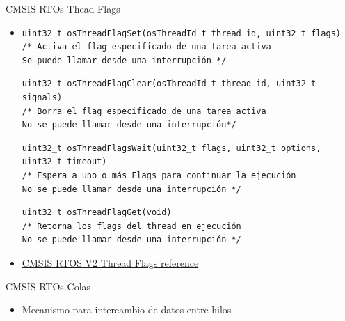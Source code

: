 \begin{frame}[fragile]{CMSIS RTOs Thead Flags}

    \begin{itemize}
        \item []
         \begin{verbatim}
uint32_t osThreadFlagSet(osThreadId_t thread_id, uint32_t flags)
/* Activa el flag especificado de una tarea activa
Se puede llamar desde una interrupción */

         \end{verbatim}
         \begin{verbatim}
uint32_t osThreadFlagClear(osThreadId_t thread_id, uint32_t signals)
/* Borra el flag especificado de una tarea activa
No se puede llamar desde una interrupción*/

         \end{verbatim}
         \begin{verbatim}
uint32_t osThreadFlagsWait(uint32_t flags, uint32_t options, uint32_t timeout)
/* Espera a uno o más Flags para continuar la ejecución
No se puede llamar desde una interrupción */

         \end{verbatim}
         \begin{verbatim}
uint32_t osThreadFlagGet(void)
/* Retorna los flags del thread en ejecución 
No se puede llamar desde una interrupción */

         \end{verbatim}      
         \item[] \href{https://arm-software.github.io/CMSIS_5/RTOS2/html/group__CMSIS__RTOS__ThreadFlagsMgmt.html}{\colorbox{BurntOrange}{CMSIS RTOS V2 Thread Flags reference}}
    \end{itemize}     
\end{frame}

\begin{frame}[fragile]{CMSIS RTOs Colas}
\begin{itemize}
    \item Mecanismo para intercambio de datos entre hilos
\end{itemize}
\end{frame}